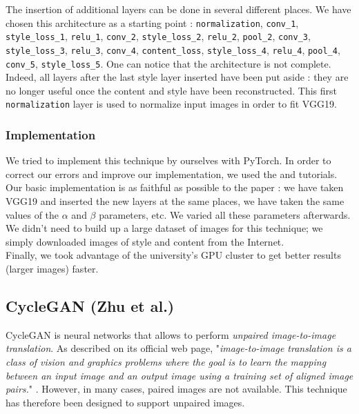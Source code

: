 \documentclass[twocolumn,superscriptaddress,aps, floatfix]{revtex4-1}
\begin{document}
    The insertion of additional layers can be done in several different places. We have chosen this architecture as a starting point : \texttt{normalization}, \texttt{conv\_1}, \texttt{style\_loss\_1}, \texttt{relu\_1}, \texttt{conv\_2}, \texttt{style\_loss\_2}, \texttt{relu\_2}, \texttt{pool\_2}, \texttt{conv\_3}, \texttt{style\_loss\_3}, \texttt{relu\_3}, \texttt{conv\_4}, \texttt{content\_loss}, \texttt{style\_loss\_4}, \texttt{relu\_4}, \texttt{pool\_4}, \texttt{conv\_5}, \texttt{style\_loss\_5}. One can notice that the architecture is not complete. Indeed, all layers after the last style layer inserted have been put aside : they are no longer useful once the content and style have been reconstructed. This first \texttt{normalization} layer is used to normalize input images in order to fit VGG19.
    
    \subsubsection{Implementation}
    
    We tried to implement this technique by ourselves with PyTorch. In order to correct our errors and improve our implementation, we used the \cite{pytorch.org} and \cite{nextjournal.com} tutorials. Our basic implementation is as faithful as possible to the paper \cite{DBLP:journals/corr/GatysEB15a} : we have taken VGG19 and inserted the new layers at the same places, we have taken the same values of the $\alpha$ and $\beta$ parameters, etc. We varied all these parameters afterwards.\\
    
    We didn't need to build up a large dataset of images for this technique; we simply downloaded images of style and content from the Internet.\\
    
    Finally, we took advantage of the university's GPU cluster to get better results (larger images) faster.
    
    \subsection{CycleGAN (Zhu et al.)}\label{methods.zhu}
    
    CycleGAN is neural networks that allows to perform \emph{unpaired image-to-image translation}. As described on its official web page, "\emph{image-to-image translation is a class of vision and graphics problems where the goal is to learn the mapping between an input image and an output image using a training set of aligned image pairs.}" \cite{junyanz.github.io}. However, in many cases, paired images are not available. This technique has therefore been designed to support unpaired images.\\
    
\end{document}
